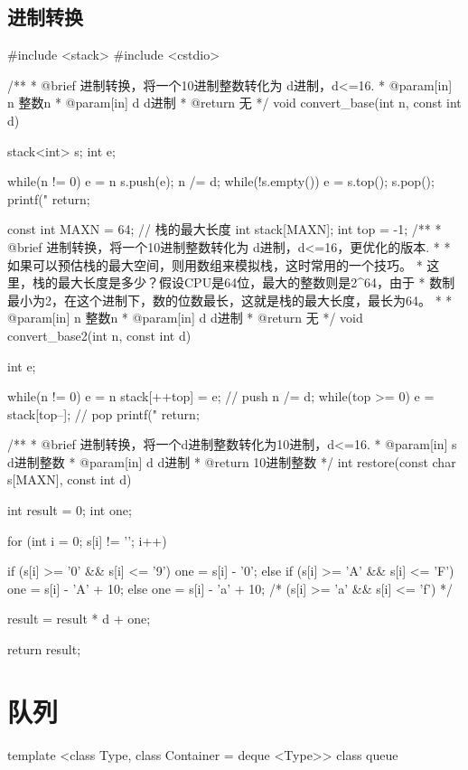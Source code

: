 \subsection{进制转换}
\begin{Codex}[label=convert_base.cpp]
#include <stack>
#include <cstdio>

 /**
  * @brief 进制转换，将一个10进制整数转化为 d进制，d<=16.
  * @param[in] n 整数n
  * @param[in] d d进制
  * @return 无
  */
void convert_base(int n, const int d) {
    stack<int> s;
    int e;

    while(n != 0) {
        e = n %
        s.push(e);
        n /= d;
    }
    while(!s.empty()) {
        e = s.top();
        s.pop();
        printf("%
    }
    return;
}

const int MAXN = 64; // 栈的最大长度
int stack[MAXN];
int top = -1;
/**
 * @brief 进制转换，将一个10进制整数转化为 d进制，d<=16，更优化的版本.
 *
 * 如果可以预估栈的最大空间，则用数组来模拟栈，这时常用的一个技巧。
 * 这里，栈的最大长度是多少？假设CPU是64位，最大的整数则是2^64，由于
 * 数制最小为2，在这个进制下，数的位数最长，这就是栈的最大长度，最长为64。
 *
 * @param[in] n 整数n
 * @param[in] d d进制
 * @return 无
 */
void convert_base2(int n, const int d) {
    int e;

    while(n != 0) {
        e = n %
        stack[++top] = e; // push
        n /= d;
    }
    while(top >= 0) {
        e = stack[top--]; // pop
        printf("%
    }
    return;
}


/**
 * @brief 进制转换，将一个d进制整数转化为10进制，d<=16.
 * @param[in] s d进制整数
 * @param[in] d d进制
 * @return 10进制整数
 */
int restore(const char s[MAXN], const int d) {
    int result = 0;
    int one;

    for (int i = 0; s[i] != '\0'; i++) {
        if (s[i] >= '0' && s[i] <= '9') one = s[i] - '0';
        else if (s[i] >= 'A' && s[i] <= 'F') one = s[i] - 'A' + 10;
        else one = s[i] - 'a' + 10; /* (s[i] >= 'a' && s[i] <= 'f') */
        
        result = result * d + one;
    }
    return result;
}
\end{Codex}

\section{队列} %

\begin{NoteCode}
template <class Type, class Container = deque <Type>>
class queue
\end{NoteCode}

